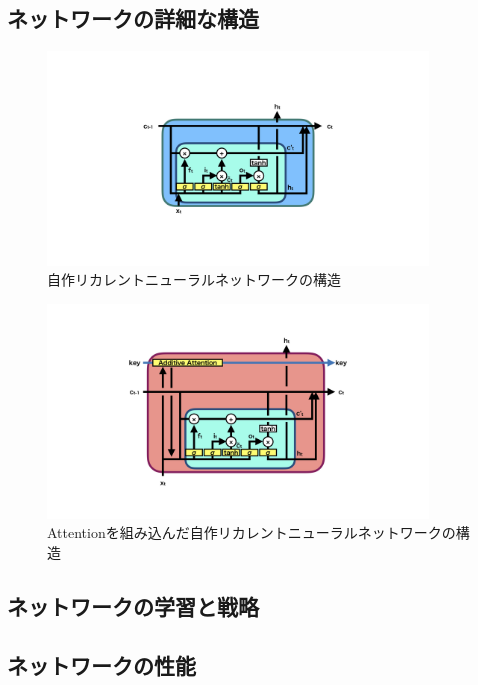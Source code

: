 \subsection{ネットワークの詳細な構造} \label{Net:VLSTM:DetailedStructureofVLSTM}

\begin{figure}[h]
 \centering
 \includegraphics[width=0.9\textwidth]{Figure/3Networks/3-4-2-1VLSTMStructure.png}
 \caption{自作リカレントニューラルネットワークの構造}
 \label{3-4-2-1VLSTMStructure}
\end{figure}

\begin{figure}[h]
 \centering
 \includegraphics[width=0.9\textwidth]{Figure/3Networks/3-4-2-2AttentionVLSTM.png}
 \caption{Attentionを組み込んだ自作リカレントニューラルネットワークの構造}
 \label{3-4-2-2AttentionVLSTM}
\end{figure}


\subsection{ネットワークの学習と戦略} \label{Net:VLSTM:TrainingandStrategyofVLSTM}

\subsection{ネットワークの性能} \label{Net:VLSTM:PerformanceofVLSTM}

